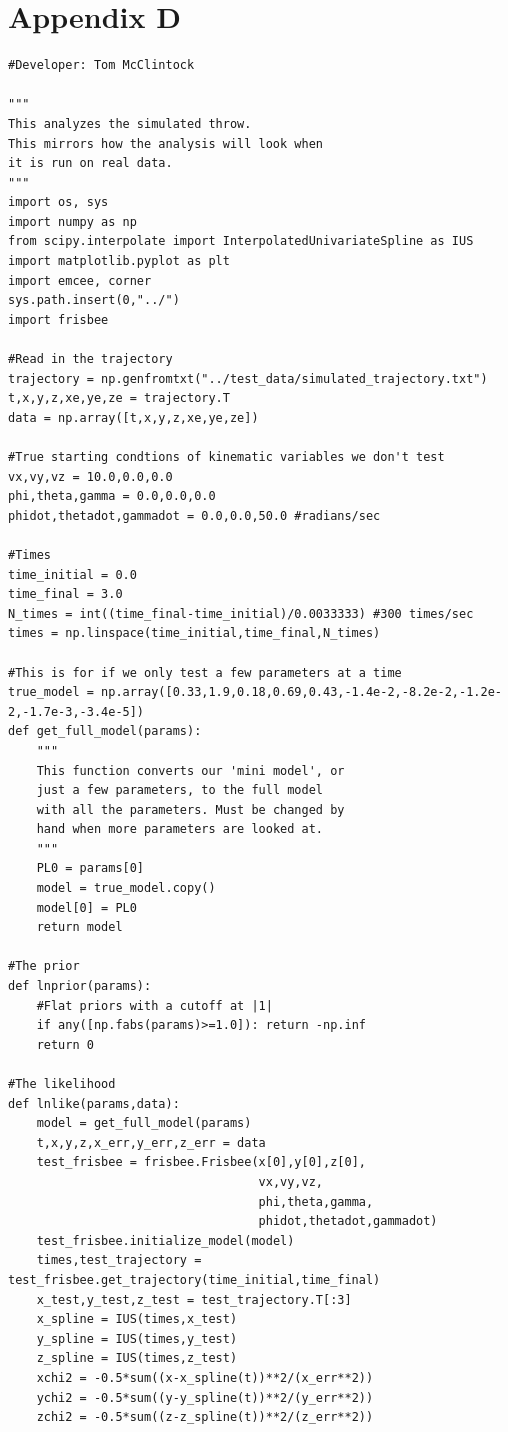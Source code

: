 \documentclass[a4paper,12pt, oneside]{article}
\begin{document}
\section*{Appendix D}
\begin{verbatim}
#Developer: Tom McClintock

"""
This analyzes the simulated throw.
This mirrors how the analysis will look when
it is run on real data.
"""
import os, sys
import numpy as np
from scipy.interpolate import InterpolatedUnivariateSpline as IUS
import matplotlib.pyplot as plt
import emcee, corner
sys.path.insert(0,"../")
import frisbee

#Read in the trajectory
trajectory = np.genfromtxt("../test_data/simulated_trajectory.txt")
t,x,y,z,xe,ye,ze = trajectory.T
data = np.array([t,x,y,z,xe,ye,ze])

#True starting condtions of kinematic variables we don't test
vx,vy,vz = 10.0,0.0,0.0
phi,theta,gamma = 0.0,0.0,0.0
phidot,thetadot,gammadot = 0.0,0.0,50.0 #radians/sec

#Times
time_initial = 0.0
time_final = 3.0
N_times = int((time_final-time_initial)/0.0033333) #300 times/sec
times = np.linspace(time_initial,time_final,N_times)

#This is for if we only test a few parameters at a time
true_model = np.array([0.33,1.9,0.18,0.69,0.43,-1.4e-2,-8.2e-2,-1.2e-2,-1.7e-3,-3.4e-5])
def get_full_model(params):
    """
    This function converts our 'mini model', or
    just a few parameters, to the full model
    with all the parameters. Must be changed by
    hand when more parameters are looked at.
    """
    PL0 = params[0]
    model = true_model.copy()
    model[0] = PL0
    return model

#The prior
def lnprior(params):
    #Flat priors with a cutoff at |1|
    if any([np.fabs(params)>=1.0]): return -np.inf
    return 0

#The likelihood
def lnlike(params,data):
    model = get_full_model(params)
    t,x,y,z,x_err,y_err,z_err = data
    test_frisbee = frisbee.Frisbee(x[0],y[0],z[0],
                                   vx,vy,vz,
                                   phi,theta,gamma,
                                   phidot,thetadot,gammadot)
    test_frisbee.initialize_model(model)
    times,test_trajectory = test_frisbee.get_trajectory(time_initial,time_final)
    x_test,y_test,z_test = test_trajectory.T[:3]
    x_spline = IUS(times,x_test)
    y_spline = IUS(times,y_test)
    z_spline = IUS(times,z_test)
    xchi2 = -0.5*sum((x-x_spline(t))**2/(x_err**2))
    ychi2 = -0.5*sum((y-y_spline(t))**2/(y_err**2))
    zchi2 = -0.5*sum((z-z_spline(t))**2/(z_err**2))


\end{verbatim}
\end{document}

